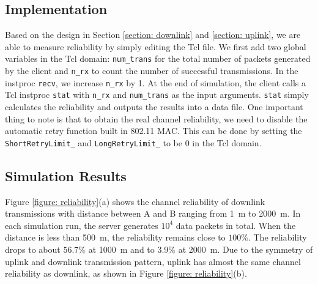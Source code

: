 \documentclass{article}
\begin{document}
\subsection{Implementation}
Based on the design in Section \ref{section: downlink} and \ref{section: uplink}, we are able to measure reliability by simply editing the Tcl file. We first add two global variables in the Tcl domain: \lstinline|num_trans| for the total number of packets generated by the client and \lstinline|n_rx| to count the number of successful transmissions. In the instproc \lstinline|recv|, we increase \lstinline|n_rx| by 1. At the end of simulation, the client calls a Tcl instproc \lstinline|stat| with \lstinline|n_rx| and \lstinline|num_trans| as the input arguments. \lstinline|stat| simply calculates the reliability and outputs the results into a data file. One important thing to note is that to obtain the real channel reliability, we need to disable the automatic retry function built in 802.11 MAC. This can be done by setting the \lstinline|ShortRetryLimit_| and \lstinline|LongRetryLimit_| to be 0 in the Tcl domain.

\subsection{Simulation Results}
Figure \ref{figure: reliability}(a) shows the channel reliability of downlink transmissions with distance between A and B ranging from \SI{1}{m} to \SI{2000}{m}. In each simulation run, the server generates $10^4$ data packets in total. When the distance is less than \SI{500}{m}, the reliability remains close to $100\%$. The reliability drops to about $56.7\%$ at \SI{1000}{m} and to $3.9\%$ at \SI{2000}{m}. Due to the symmetry of uplink and downlink transmission pattern, uplink has almost the same channel reliability as downlink, as shown in Figure \ref{figure: reliability}(b).
\end{document}
